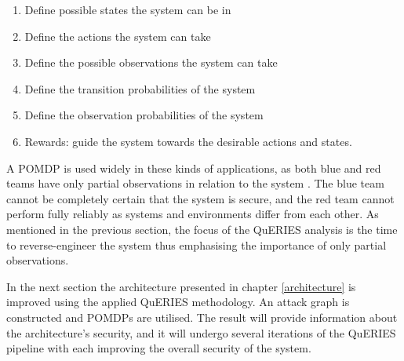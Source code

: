 \begin{enumerate}
    \item Define possible states the system can be in
    \item Define the actions the system can take
    \item Define the possible observations the system can take
    \item Define the transition probabilities of the system
    \item Define the observation probabilities of the system
    \item Rewards: guide the system towards the desirable actions and
      states.
\end{enumerate} 
A POMDP is used widely in these kinds of applications, as both blue and
red teams have only partial observations in relation to the system
\cite{mcabeeMarkov}. The blue team cannot be completely certain that
the system is secure, and the red team cannot perform fully reliably as
systems and environments differ from each other. As mentioned in the
previous section, the focus of the QuERIES analysis is the time to
reverse-engineer the system thus emphasising the importance of only
partial observations.

In the next section the architecture presented in chapter
\ref{architecture} is improved using the applied QuERIES methodology. An
attack graph is constructed and POMDPs are utilised. The result will
provide information about the architecture's security, and it will
undergo several iterations of the QuERIES pipeline with each improving
the overall security of the system.
